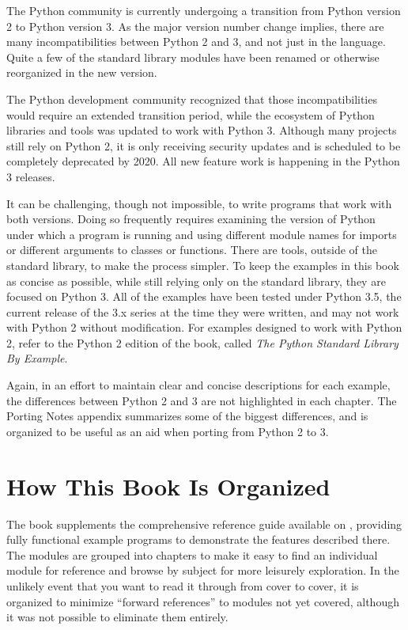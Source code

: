 The Python community is currently undergoing a transition from Python
version 2 to Python version 3. As the major version number change
implies, there are many incompatibilities between Python 2 and 3, and
not just in the language. Quite a few of the standard library modules
have been renamed or otherwise reorganized in the new version.

The Python development community recognized that those
incompatibilities would require an extended transition period, while
the ecosystem of Python libraries and tools was updated to work with
Python 3.  Although many projects still rely on Python 2, it is only
receiving security updates and is scheduled to be completely
deprecated by 2020. All new feature work is happening in the Python 3
releases.

It can be challenging, though not impossible, to write programs that
work with both versions. Doing so frequently requires examining the
version of Python under which a program is running and using different
module names for imports or different arguments to classes or
functions. There are tools, outside of the standard library, to make
the process simpler. To keep the examples in this book as concise as
possible, while still relying only on the standard library, they are
focused on Python 3.  All of the examples have been tested under
Python 3.5, the current release of the 3.x series at the time they
were written, and may not work with Python 2 without modification.
For examples designed to work with Python 2, refer to the Python 2
edition of the book, called \textit{The Python Standard Library By
  Example}.

Again, in an effort to maintain clear and concise descriptions for
each example, the differences between Python 2 and 3 are not
highlighted in each chapter. The Porting Notes appendix summarizes
some of the biggest differences, and is organized to be useful as an
aid when porting from Python 2 to 3.

\section*{How This Book Is Organized}

The book supplements the comprehensive reference guide available on
, providing fully functional
example programs to demonstrate the features described there. The
modules are grouped into chapters to make it easy to find an
individual module for reference and browse by subject for more
leisurely exploration. In the unlikely event that you want to read it
through from cover to cover, it is organized to minimize ``forward
references'' to modules not yet covered, although it was not possible
to eliminate them entirely.

